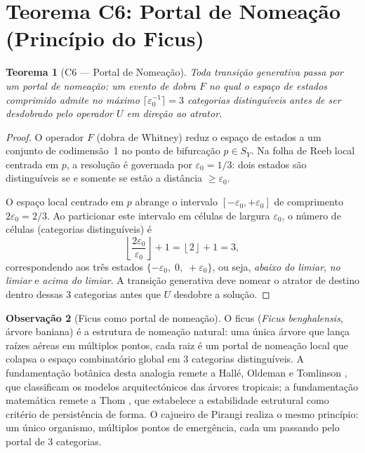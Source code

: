 \documentclass[12pt,a4paper,twoside]{book}
\theoremstyle{plain}
\newtheorem{teorema}{Teorema}[section]
\theoremstyle{definition}
\theoremstyle{definition}
\newtheorem{observacao}[teorema]{Observação}
\newcommand{\epsz}{\varepsilon_{0}}
\begin{document}
\section{Teorema C6: Portal de Nomeação (Princípio do Ficus)}
\label{sec:C6}

\begin{teorema}[C6 — Portal de Nomeação]\label{thm:C6}
Toda transição generativa passa por um portal de nomeação: um evento de
dobra $F$ no qual o espaço de estados comprimido admite no máximo
$\lceil\epsz^{-1}\rceil = 3$ categorias distinguíveis antes de ser
desdobrado pelo operador $U$ em direção ao atrator.
\end{teorema}

\begin{proof}
O operador $F$ (dobra de Whitney) reduz o espaço de estados a um conjunto
de codimensão~1 no ponto de bifurcação $p \in S_{Y}$. Na folha de Reeb
local centrada em $p$, a resolução é governada por $\epsz = 1/3$: dois
estados são distinguíveis se e somente se estão a distância $\ge \epsz$.

O espaço local centrado em $p$ abrange o intervalo $[-\epsz, +\epsz]$
de comprimento $2\epsz = 2/3$. Ao particionar este intervalo em células
de largura $\epsz$, o número de células (categorias distinguíveis) é
\[
  \left\lfloor \frac{2\epsz}{\epsz} \right\rfloor + 1
  = \left\lfloor 2 \right\rfloor + 1 = 3,
\]
correspondendo aos três estados $\{-\epsz,\; 0,\; +\epsz\}$, ou seja,
\emph{abaixo do limiar}, \emph{no limiar} e \emph{acima do limiar}.
A transição generativa deve nomear o atrator de destino dentro dessas
3 categorias antes que $U$ desdobre a solução.
\end{proof}

\begin{observacao}[Ficus como portal de nomeação]
O ficus (\emph{Ficus benghalensis}, árvore baniana) é a estrutura de
nomeação natural: uma única árvore que lança raízes aéreas em múltiplos
pontos, cada raiz é um portal de nomeação local que colapsa o espaço
combinatório global em 3 categorias distinguíveis. A fundamentação
botânica desta analogia remete a Hallé, Oldeman e Tomlinson
\cite{Halle1978}, que classificam os modelos arquitectónicos das árvores
tropicais; a fundamentação matemática remete a Thom \cite{Thom1975}, que
estabelece a estabilidade estrutural como critério de persistência de
forma. O cajueiro de Pirangi realiza o mesmo princípio: um único organismo,
múltiplos pontos de emergência, cada um passando pelo portal de 3
categorias.
\end{observacao}
\end{document}

